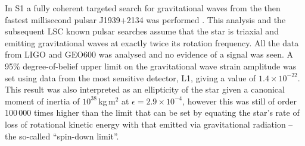 \documentclass{article}
\begin{document}
In S1 a fully coherent targeted search for gravitational waves from the then
fastest millisecond pulsar J1939+2134 was performed \cite{Abbott:2004d}. This
analysis and the subsequent LSC known pulsar searches assume that the star is
triaxial and emitting gravitational waves at exactly twice its rotation
frequency. All the data from LIGO and GEO600 was analysed and no evidence of a
signal was seen. A 95\% degree-of-belief upper limit on the gravitational wave
strain amplitude was set using data from the most sensitive detector, L1, giving
a value of $1.4\times10^{-22}$. This result was also interpreted as an
ellipticity of the star given a canonical moment of inertia of
$10^{38}$\,kg\,m$^2$ at $\epsilon = 2.9\times10^{-4}$, however this was still of
order 100\,000 times higher than the limit that can be set by equating the
star's rate of loss of rotational kinetic energy with that emitted via
gravitational radiation -- the so-called ``spin-down limit''.
\end{document}
